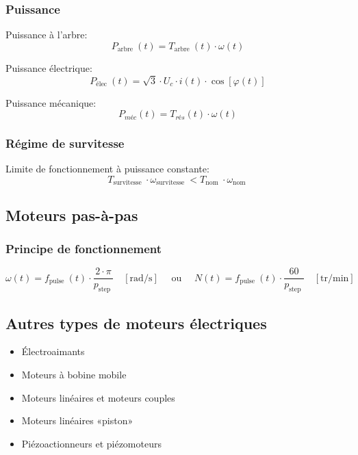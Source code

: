 \documentclass[10pt]{article} %
\begin{document}
\begin{multicols}{3}
\begin{flushleft}
			\subsubsection*{Puissance}
				Puissance à l'arbre:
				\[P_{\text {arbre }}(t)=T_{\text {arbre }}(t) \cdot \omega(t)\]
				
				Puissance électrique:
				\[P_{\text {élec }}(t)=\sqrt{3} \cdot U_{c} \cdot i(t) \cdot \cos [\varphi(t)]\]
				
				Puissance mécanique:
				\[P_{m é c}(t)=T_{r é s}(t) \cdot \omega(t)\]
			
			\subsubsection*{Régime de survitesse}
			
			Limite de fonctionnement à puissance constante:
			\[T_{\text {survitesse }} \cdot \omega_{\text {survitesse }}<T_{\text {nom }} \cdot \omega_{\text {nom }}\]
			
		\subsection*{Moteurs pas-à-pas}
			
			\subsubsection*{Principe de fonctionnement}
				
				\[\omega(t)=f_{\text {pulse }}(t) \cdot \frac{2 \cdot \pi}{p_{\text {step }}} \quad[\mathrm{rad} / \mathrm{s}] \quad \text { ou } \quad N(t)=f_{\text {pulse }}(t) \cdot \frac{60}{p_{\text {step }}} \quad[\mathrm{tr} / \mathrm{min}]\]
				
		\subsection*{Autres types de moteurs électriques}
		
			\begin{itemize}
				\item Électroaimants
				\item Moteurs à bobine mobile
				\item Moteurs linéaires et moteurs couples
				\item Moteurs linéaires «piston»
				\item Piézoactionneurs et piézomoteurs
			\end{itemize}
		

\end{flushleft}
\end{multicols}
\end{document}
